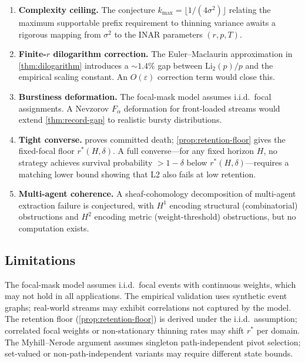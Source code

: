 \documentclass[11pt]{article}
\theoremstyle{plain}
\theoremstyle{definition}
\theoremstyle{remark}
\begin{document}
\begin{enumerate}[label=\arabic*.]
  \item \textbf{Complexity ceiling.}  The conjecture
    $k_{\max} = \lfloor 1/(4\sigma^2) \rfloor$ relating the maximum
    supportable prefix requirement to thinning variance awaits a
    rigorous mapping from $\sigma^2$ to the INAR parameters $(r, p, T)$.

  \item \textbf{Finite-$r$ dilogarithm correction.}  The
    Euler--Maclaurin approximation in \cref{thm:dilogarithm} introduces
    a ${\sim}1.4\%$ gap between $\mathrm{Li}_2(p)/p$ and the empirical
    scaling constant.  An $O(\varepsilon)$ correction term would close
    this.

  \item \textbf{Burstiness deformation.}  The focal-mask model assumes
    i.i.d.\ focal assignments.  A Nevzorov $F_\alpha$ deformation for
    front-loaded streams would extend \cref{thm:record-gap} to
    realistic bursty distributions.

  \item \textbf{Tight converse.}   proves committed
    death; \cref{prop:retention-floor} gives the fixed-focal floor
    $r^*(H,\delta)$.  A full converse---for any fixed horizon $H$, no
    strategy achieves survival probability $> 1 - \delta$ below
    $r^*(H,\delta)$---requires a matching lower bound showing that L2
    also fails at low retention.

  \item \textbf{Multi-agent coherence.}  A sheaf-cohomology
    decomposition of multi-agent extraction failure is conjectured, with
    $H^1$ encoding structural (combinatorial) obstructions and $H^2$
    encoding metric (weight-threshold) obstructions, but no computation
    exists.
\end{enumerate}

\subsection{Limitations}

The focal-mask model assumes i.i.d.\ focal events with continuous
weights, which may not hold in all applications.  The empirical
validation uses synthetic event graphs; real-world streams may exhibit
correlations not captured by the model.  The retention floor
(\cref{prop:retention-floor}) is derived under the i.i.d.\ assumption;
correlated focal weights or non-stationary thinning rates may shift
$r^*$ per domain.  The Myhill--Nerode argument assumes singleton
path-independent pivot selection; set-valued or non-path-independent
variants may require different state bounds.
\end{document}
